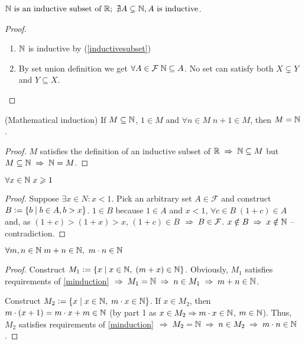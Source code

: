 \begin{theorem}
    $ \mathbb{N}\text{ is an inductive subset of } \mathbb{R};\ \nexists A \subsetneq \mathbb{N}, A \text{ is inductive}$.
\end{theorem}
\begin{proof}\phantom\\
    \begin{enumerate}
        \item $\mathbb{N}$ is inductive by (\ref{inductivesubset})
        \item By set union definition we get $\forall A \in \mathcal{F} \; \mathbb{N} \subseteq A$. No set can satisfy both $X \subsetneq Y$ and $Y \subseteq X$.
    \end{enumerate}
\end{proof}

\begin{theorem} (Mathematical induction)
    If $M \subseteq \mathbb{N}$, $1 \in M$ and $\forall n \in M \; n + 1 \in M$, then $M = \mathbb{N}$.
    \label{minduction}
\end{theorem}
\begin{proof}
    $M$ satisfies the definition of an inductive subset of $\RR \thus \NN \subseteq M$ but ${M \subseteq \NN} \thus {\NN = M}$.
\end{proof}

\begin{theorem}
    $ \forall x \in \mathbb{N} \; x \geqslant 1 $
\end{theorem}
\begin{proof}
    Suppose $\exists x \in N : x < 1$. Pick an arbitrary set $A \in \mathcal{F}$ and construct $B \vcentcolon= \{b \;\vert\; b \in A, b > x\}$. $1 \in B$ because $1 \in A$ and $x < 1$, $\forall c \in B \; (1 + c) \in A$ and, as $(1 + c) > (1 + x) > x$, $(1 + c) \in B$ $\thus B \in \mathcal{F}$. $x \notin B \thus x \notin \NN$ -- contradiction.
\end{proof}

\begin{theorem}
    $ \forall m, n \in \mathbb{N} \; m + n \in \mathbb{N},\ m \cdot n \in \mathbb{N}$
\end{theorem}
\begin{proof}
    Construct $M_1 \vcentcolon= \{x \;\vert\; x \in \mathbb{N},\; (m + x) \in \mathbb{N}\}$. Obviously, $M_1$ satisfies requirements of \ref{minduction} $\thus M_1 = \NN \thus n \in M_1 \thus m + n \in \NN$.

    Construct $M_2 \vcentcolon= \{x \;\vert\; x \in \mathbb{N},\; m \cdot x \in \mathbb{N}\}$. If $x \in M_2$, then $m \cdot (x + 1) = m \cdot x + m \in \mathbb{N}$ (by part 1 as $x \in M_2 \Rightarrow m \cdot x \in \mathbb{N}$, $m \in \mathbb{N}$). Thus, $M_2$ satisfies requirements of \ref{minduction} $\thus M_2 = \NN \thus n \in M_2 \thus m \cdot n \in \NN$.
\end{proof}

